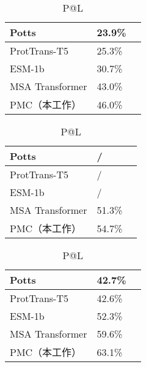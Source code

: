 \begin{table}
    \parbox{.32\linewidth}{
    \centering
        \caption{P@L/5}
        \begin{tabular}{lll}
        \hline
            Potts           & 23.9\% \\ \hline
            ProtTrans-T5    & 25.3\% \\ \hline
            ESM-1b          & 30.7\% \\ \hline
            MSA Transformer & 43.0\% \\ \hline
            PMC（本工作）    & 46.0\% \\ \hline
        \end{tabular}
        \label{tab:l5}
    }
    \hfill
    \parbox{.32\linewidth}{
    \centering
        \caption{P@L/2}
        \begin{tabular}{lll}
        \hline
            Potts           & / \\ \hline
            ProtTrans-T5    & / \\ \hline
            ESM-1b          & / \\ \hline
            MSA Transformer & 51.3\% \\ \hline
            PMC（本工作）    & 54.7\% \\ \hline
        \end{tabular}
        \label{tab:l2}
    }
    \hfill
    \parbox{.32\linewidth}{
    \centering
        \caption{P@L}
        \begin{tabular}{lll}
        \hline
            Potts           & 42.7\% \\ \hline
            ProtTrans-T5    & 42.6\% \\ \hline
            ESM-1b          & 52.3\% \\ \hline
            MSA Transformer & 59.6\% \\ \hline
            PMC（本工作）    & 63.1\% \\ \hline
        \end{tabular}
        \label{tab:l}
    }
\end{table}